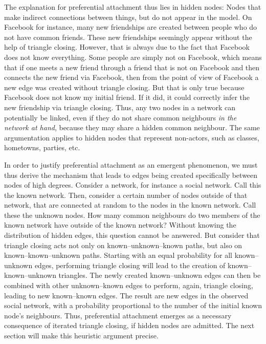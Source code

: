 \documentclass{jimis-final-en}
\begin{document}
The explanation for preferential attachment thus lies in hidden nodes:
Nodes that make indirect connections between things, but do not appear
in the model.  On Facebook for instance, many new
friendships are created between people who do not have common friends.
These new friendships seemingly appear without the help of triangle
closing.  However, that is always due to the fact that Facebook does not know
everything.  Some people are simply not on Facebook, which means that if
one meets a new friend through a friend that is not on Facebook and
then connects the new friend via Facebook, then from the point of
view of Facebook a new edge was created without triangle closing.
But
that is only true because Facebook does not know my initial friend.  If
it did, it could correctly infer the new friendship via triangle
closing.  Thus, any two nodes in a network can potentially be linked,
even if they do not share common neighbours \emph{in the network at
  hand}, because they may share a hidden common neighbour.  
The same argumentation applies to hidden nodes that represent
non-actors, such as classes, hometowns, parties, etc. 

In order to justify preferential attachment as an emergent phenomenon,
we must thus derive the mechanism that leads to edges being created
specifically between nodes of high degrees. 
Consider a network, for instance a social
network.  Call this the known network.  Then, consider a certain number of
nodes outside of that 
network, that are connected at random to the nodes in the known
network.  Call these the unknown nodes.   How many common neighbours do
two members of the known network 
have outside of the known network?  Without knowing the distribution of
hidden edges, this question cannot be answered.  But consider that
triangle closing acts not only on known--unknown--known paths, but
also on known--known--unknown paths.  Starting with an equal
probability for all known--unknown edges, performing triangle closing
will lead to the creation of known--known--unknown triangles.  The newly
created known--unknown edges can then be combined with other
unknown--known edges to perform, again, triangle closing, leading to new 
known--known edges.  The result are new edges in the observed social
network, with a probability proportional to the number of the initial
known node's neighbours.  
Thus, preferential attachment emerges as a necessary consequence of
iterated triangle closing, if hidden nodes are admitted.
The next section will make this heuristic argument precise. 
\end{document}
